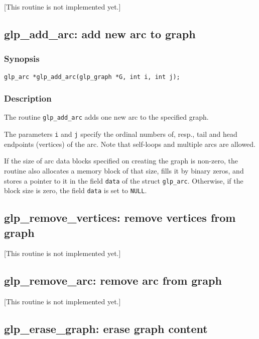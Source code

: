 [This routine is not implemented yet.]

\subsection{glp\_add\_arc: add new arc to graph}

\subsubsection*{Synopsis}

\begin{verbatim}
glp_arc *glp_add_arc(glp_graph *G, int i, int j);
\end{verbatim}

\subsubsection*{Description}

The routine \verb|glp_add_arc| adds one new arc to the specified graph.

The parameters \verb|i| and \verb|j| specify the ordinal numbers of,
resp., tail and head endpoints (vertices) of the arc. Note that
self-loops and multiple arcs are allowed.

If the size of arc data blocks specified on creating the graph is
non-zero, the routine also allocates a memory block of that size, fills
it by binary zeros, and stores a pointer to it in the field \verb|data|
of the struct \verb|glp_arc|. Otherwise, if the block size is zero, the
field \verb|data| is set to \verb|NULL|.

\subsection{glp\_remove\_vertices: remove vertices from graph}

[This routine is not implemented yet.]

\subsection{glp\_remove\_arc: remove arc from graph}

[This routine is not implemented yet.]

\subsection{glp\_erase\_graph: erase graph content}

